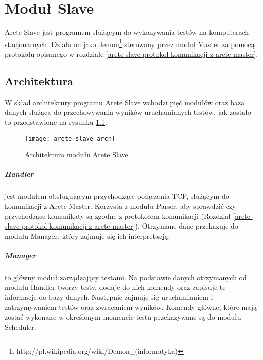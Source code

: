 \documentclass[00-praca-magisterska.tex]{subfiles}
\begin{document}
\chapter{Moduł Slave}
\label{arete-slave}

Arete Slave jest programem służącym do wykonywania testów na komputerach
stacjonarnych. Działa on jako
demon\footnote{http://pl.wikipedia.org/wiki/Demon\_(informatyka)} sterowany
przez moduł Master za pomocą protokołu opisanego w rozdziale
\ref{arete-slave-protokol-komunikacji-z-arete-master}.

\section{Architektura}
\label{arete-slave-architektura}

W skład architektury programu Arete Slave wchodzi pięć modułów oraz baza danych
służąca do przechowywania wyników uruchamianych testów, jak zostało to
przedstawione na rysunku \ref{fig:arete-slave-arch}.

\begin{figure}[htb]
\begin{center}
\leavevmode
\texttt{[image: arete-slave-arch]}
\end{center}
\caption{Architektura modułu Arete Slave.}
\label{fig:arete-slave-arch}
\end{figure}

\paragraph{Handler} jest modułem obsługującym przychodzące połączenia TCP,
służącym do komunikacji z Arete Master. Korzysta z modułu Parser, aby sprawdzić czy
przychodzące komunikaty są zgodne z protokołem komunikacji (Rozdział
\ref{arete-slave-protokol-komunikacji-z-arete-master}). Otrzymane dane przekazuje do modułu Manager, który
zajmuje się ich interpretacją.

\paragraph{Manager} to główny moduł zarządzający testami. Na podstawie danych
otrzymanych od modułu Handler tworzy testy, dodaje do nich komendy oraz zapisuje te
informacje do bazy danych. Następnie zajmuje się uruchamianiem i zatrzymywaniem
testów oraz zwracaniem wyników. Komendy główne, które mają zostać wykonane w
określonym momencie testu przekazywane są do modułu Scheduler. 
\end{document}
